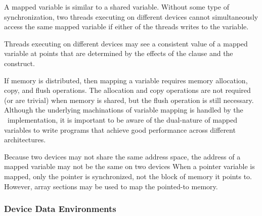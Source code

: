 A mapped variable is similar to a shared variable.  Without some 
type of synchronization, two threads executing on
different devices cannot simultaneously access the same mapped variable if
either of the threads writes to the variable.  

Threads executing on different devices may see a consistent value of a mapped
variable at points that are determined by the effects of the  clause
and the  construct.

If memory is distributed, then mapping a variable requires memory allocation,
copy, and flush operations.  The allocation and copy operations are not
required (or are trivial) when memory is shared, but the flush
operation is still necessary.  Although the underlying machinations of variable mapping
is handled by the \OMP\ implementation, it is important to be aware
of the dual-nature of mapped variables to write programs that 
achieve good performance across different architectures.  

Because two devices may not share the same address space,
the address of a mapped variable may not be the same on two devices
When a pointer variable is mapped, only the pointer is synchronized, not the
block of memory it points to.  However, array sections may be used to map the
pointed-to memory.



\subsubsection{Device Data Environments}
\label{ssec:06.device-data-environments}

